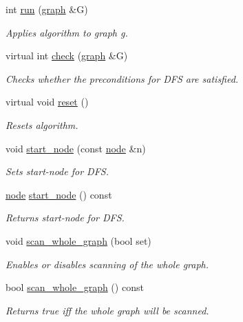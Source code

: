 \begin{DoxyCompactItemize}
int \mbox{\hyperlink{classdfs_af0863b8974d5fd58cd0375c78ed8163b}{run}} (\mbox{\hyperlink{classgraph}{graph}} \&G)
\begin{DoxyCompactList}\small\item\em Applies algorithm to graph g. \end{DoxyCompactList}\item 
virtual int \mbox{\hyperlink{classdfs_a1af70060897529e67910f589b047e576}{check}} (\mbox{\hyperlink{classgraph}{graph}} \&G)
\begin{DoxyCompactList}\small\item\em Checks whether the preconditions for D\+FS are satisfied. \end{DoxyCompactList}\item 
virtual void \mbox{\hyperlink{classdfs_affaffda8be8418d6dbf396c5b1d6b81a}{reset}} ()
\begin{DoxyCompactList}\small\item\em Resets algorithm. \end{DoxyCompactList}\item 
void \mbox{\hyperlink{classdfs_aad21fd0d3036350fd341f877d5747852}{start\+\_\+node}} (const \mbox{\hyperlink{classnode}{node}} \&n)
\begin{DoxyCompactList}\small\item\em Sets start-\/node for D\+FS. \end{DoxyCompactList}\item 
\mbox{\hyperlink{classnode}{node}} \mbox{\hyperlink{classdfs_a7688d8eaf1308438820fec2ffe21257c}{start\+\_\+node}} () const
\begin{DoxyCompactList}\small\item\em Returns start-\/node for D\+FS. \end{DoxyCompactList}\item 
void \mbox{\hyperlink{classdfs_aa7c864a6f3a120720138b187b3ed95b5}{scan\+\_\+whole\+\_\+graph}} (bool set)
\begin{DoxyCompactList}\small\item\em Enables or disables scanning of the whole graph. \end{DoxyCompactList}\item 
bool \mbox{\hyperlink{classdfs_a025ed2d6101a7b9f72578a52b484ef50}{scan\+\_\+whole\+\_\+graph}} () const
\begin{DoxyCompactList}\small\item\em Returns true iff the whole graph will be scanned. \end{DoxyCompactList}\item 

\end{DoxyCompactItemize}
